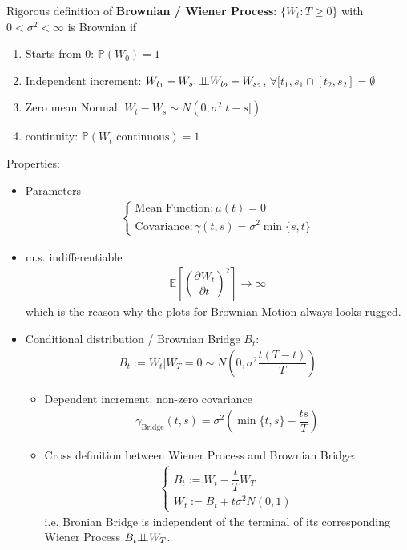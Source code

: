 Rigorous definition of \textbf{Brownian / Wiener Process}: $ \{W_t:T\geq 0\} $ with $ 0<\sigma ^2<\infty $ is Brownian if
\begin{enumerate}[topsep=2pt,itemsep=2pt]
    \item Starts from $ 0 $: $ \mathbb{P}\left( W_0 \right) =1 $
    \item Independent increment: $ W_{t_1}-W_{s_1}\bot\!\!\!\bot W_{t_2}-W_{s_2} $, $  \forall [t_1,s_1\cap [t_2,s_2]=\emptyset $
    \item Zero mean Normal: $ W_t-W_s\sim N(0,\sigma ^2\vert t-s\vert) $
    \item continuity: $ \mathbb{P}\left( W_t\text{ continuous} \right) =1 $ 
\end{enumerate}

Properties:
\begin{itemize}[topsep=2pt,itemsep=0pt]
        \item Parameters
        \begin{align}
            \begin{cases}
                \text{Mean Function}:\mu (t)=0\\
                \text{Covariance}:\gamma (t,s)=\sigma ^2 \min\{s,t\} 
            \end{cases} 
        \end{align}
        \item m.s. indifferentiable
        \begin{align}
            \mathbb{E}\left[ \left(\dfrac{\partial^{} W_t}{\partial t^{}}\right)^2 \right]\to \infty  
        \end{align}
        which is the reason why the plots for Brownian Motion always looks rugged.
        \item Conditional distribution / Brownian Bridge $ B_t $:
        \begin{align}
            B_t := W_t|W_T=0 \sim N(0,\sigma ^2\dfrac{t(T-t)}{T})
        \end{align}
        \begin{itemize}[topsep=2pt,itemsep=0pt]
            \item Dependent increment: non-zero covariance
        \begin{align}
            \gamma_\mathrm{Bridge}  (t,s) = \sigma ^2\left(\min\{t,s\}-\dfrac{ts}{T}\right)
        \end{align}
            \item Cross definition between Wiener Process and Brownian Bridge:
            \begin{align}
                \begin{cases}
                    B_t:=W_t-\dfrac{t}{T}W_T\\
                    W_t:=B_t+t \sigma ^2 N(0,1) 
                \end{cases}
            \end{align}
            i.e. Bronian Bridge is independent of the terminal of its corresponding Wiener Process $ B_t\bot\!\!\!\bot W_T $.
        \end{itemize}
\end{itemize}

